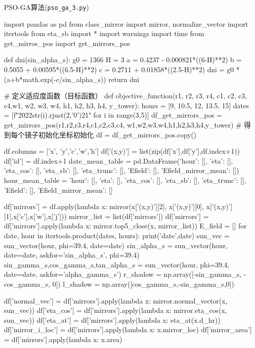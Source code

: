 \documentclass{article}
\numberwithin{equation}{subsection}
\begin{document}
PSO-GA算法(\verb|pso_ga_3.py|)
\begin{python}
import pandas as pd
from class_mirror import mirror, normalize_vector
import itertools
from eta_sb import *
import warnings
import time
from get_mirros_pos import get_mirrors_pos

def dni(sin_alpha_s):
    g0 = 1366
    H = 3
    a = 0.4237 - 0.000821*((6-H)**2)
    b = 0.5055 + 0.00595*((6.5-H)**2)
    c = 0.2711 + 0.01858*((2.5-H)**2)
    dni = g0 * (a+b*math.exp(-c/sin_alpha_s))
    return dni


# 定义适应度函数（目标函数）
def objective_function(r1, r2, r3, r4, c1, c2, c3, c4,w1, w2, w3, w4, h1, h2, h3, h4, y_tower):
    hours = [9, 10.5, 12, 13.5, 15]
    dates = [f"2022{str(i).rjust(2,'0')}21" for i in range(3,5)]
    df_get_mirrors_pos = get_mirrors_pos(r1,r2,r3,r4,c1,c2,c3,c4,
                                w1,w2,w3,w4,h1,h2,h3,h4,y_tower)  # 得到每个镜子初始化坐标初始化
    df = df_get_mirrors_pos.copy()

    df.columns = ['x', 'y','c','w','h']
    df['(x,y)'] = list(zip(df['x'],df['y'],df.index+1))
    df['id'] = df.index+1
    date_mean_table = pd.DataFrame({'hour': [], 'eta': [], 'eta_cos': [], 'eta_sb': [], 'eta_trunc': [], 'Efield': [], 'Efield_mirror_mean': []})
    hour_mean_table = {'hour': [], 'eta': [], 'eta_cos': [], 'eta_sb': [], 'eta_trunc': [], 'Efield': [],
                       'Efield_mirror_mean': []}

    df['mirrors'] = df.apply(lambda x: mirror(x['(x,y)'][2], x['(x,y)'][0], x['(x,y)'][1],x['c'],x['w'],x['j']))
    mirror_list = list(df['mirrors'])
    df['mirrors'] = df['mirrors'].apply(lambda x: mirror.top5_close(x, mirror_list))
    E_field = []
    for date, hour in itertools.product(dates, hours):
        print('date',date)
        sun_vec = sun_vector(hour, phi=39.4, date=date)
        sin_alpha_s = sun_vector(hour, date=date, askfor='sin_alpha_s', phi=39.4)
        sin_gamma_s,cos_gamma_s,tan_alpha_s = sun_vector(hour, phi=39.4, date=date, askfor='alpha_gamma_s')
        r_shadow = np.array([-sin_gamma_s, -cos_gamma_s, 0])
        l_shadow = np.array([cos_gamma_s,-sin_gamma_s,0])

        df['normal_vec'] = df['mirrors'].apply(lambda x: mirror.normal_vector(x, sun_vec))
        df['eta_cos'] = df['mirrors'].apply(lambda x: mirror.eta_cos(x, sun_vec))
        df['eta_at'] = df['mirrors'].apply(lambda x: eta_at(x.d_hr))
        df['mirror_i_loc'] = df['mirrors'].apply(lambda x: x.mirror_loc)
        df['mirror_area'] = df['mirrors'].apply(lambda x: x.area)


\end{python}
\end{document}
